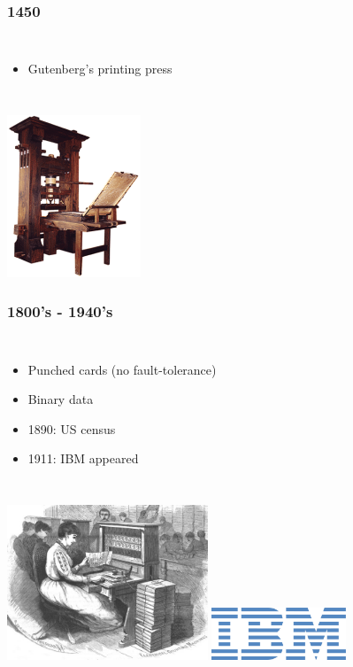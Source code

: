 \documentclass{beamer}
\begin{document}
\begin{frame}
\frametitle{1450}
\begin{columns}[c] 
\column{30em}
\begin{itemize}
  \justifying
  \item Gutenberg's printing press
\end{itemize}
\end{columns}
\vspace{0.75cm}
\hspace*{4.5cm}\includegraphics[width=4cm]{figs/gutenberg.pdf}
\end{frame}

\begin{frame}
\frametitle{1800's - 1940's}
\begin{columns}[c] 
\column{30em}
\begin{itemize}
  \justifying
  \item Punched cards (no fault-tolerance)
  \item Binary data
  \item 1890: US census
  \item 1911: IBM appeared
\end{itemize}
\end{columns}
\vspace{0.5cm}
\begin{columns}[c] 
\includegraphics[width=6cm]{figs/punch_card.pdf}
\hspace*{1cm}\includegraphics[width=4cm]{figs/ibm.pdf}
\end{columns}
\end{frame}
\end{document}
